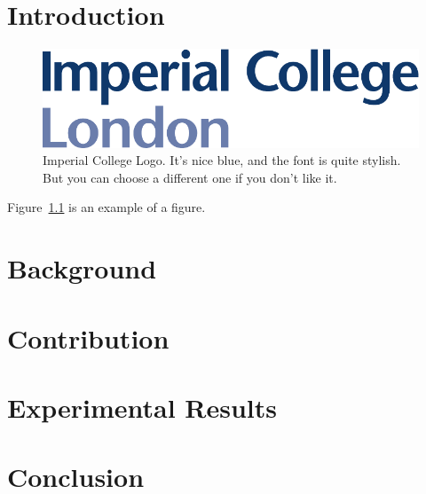 \documentclass[12pt,twoside]{report}
\date{September 2019}
\begin{document}



\clearpage{\pagestyle{empty}\cleardoublepage}
\setcounter{page}{1}
\pagestyle{fancy}

\tableofcontents 


\clearpage{\pagestyle{empty}\cleardoublepage}
\setcounter{page}{1}
\fancyhead[LE,RO]{\slshape \rightmark}
\fancyhead[LO,RE]{\slshape \leftmark}

\chapter{Introduction}

\begin{figure}[tb]
\centering
\includegraphics[width = 0.4\hsize]{./figures/imperial}
\caption{Imperial College Logo. It's nice blue, and the font is quite stylish. But you can choose a different one if you don't like it.}
\label{fig:logo}
\end{figure}

Figure~\ref{fig:logo} is an example of a figure. 

\chapter{Background}



\chapter{Contribution}


\chapter{Experimental Results}


\chapter{Conclusion}



\end{document}
